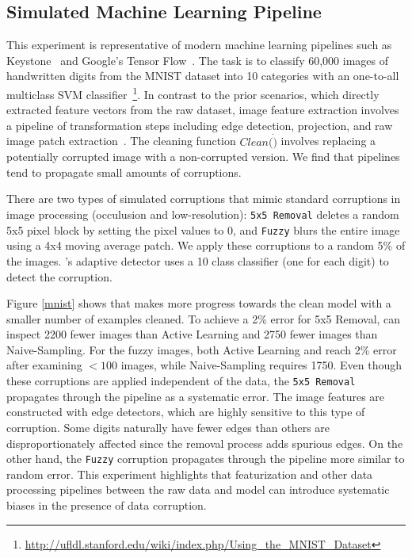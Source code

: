 \subsection{Simulated Machine Learning Pipeline}
This experiment is representative of modern machine learning pipelines such as Keystone~\cite{keystone} and Google's Tensor Flow~\cite{tensor}. 
The task is to classify 60,000 images of handwritten digits from the MNIST dataset into 10 categories with an one-to-all multiclass SVM classifier~\footnote{\scriptsize\url{http://ufldl.stanford.edu/wiki/index.php/Using_the_MNIST_Dataset}}. 
In contrast to the prior scenarios, which directly extracted feature vectors from the raw dataset, image feature extraction involves a pipeline of transformation steps including edge detection, projection, and raw image patch extraction~\cite{keystone,tensor}.
The cleaning function $Clean(\dot)$ involves replacing a potentially corrupted image with a non-corrupted version.
We find that pipelines tend to propagate small amounts of corruptions.

There are two types of simulated corruptions that mimic standard corruptions in image processing (occulusion and low-resolution): \texttt{5x5 Removal} deletes a random 5x5 pixel block by setting the pixel values to 0, and \texttt{Fuzzy} blurs the entire image using a 4x4 moving average patch. 
We apply these corruptions to a random 5\% of the images.
\sys's adaptive detector uses a 10 class classifier (one for each digit) to detect the corruption.

Figure \ref{mnist} shows that \sys makes more progress towards the clean model with a smaller number of examples cleaned.
To achieve a 2\% error for 5x5 Removal, \sys can inspect 2200 fewer images than Active Learning and 2750 fewer images than Naive-Sampling.
For the fuzzy images, both Active Learning and \sys reach 2\% error after examining $<100$ images, while Naive-Sampling requires 1750.
Even though these corruptions are applied independent of the data, the \texttt{5x5 Removal} propagates through the pipeline as a systematic error.
The image features are constructed with edge detectors, which are highly sensitive to this type of corruption.
Some digits naturally have fewer edges than others are disproportionately affected since the removal process adds spurious edges.
On the other hand, the \texttt{Fuzzy} corruption propagates through the pipeline more similar to random error.
This experiment highlights that featurization and other data processing pipelines between the raw data and model can introduce systematic biases in the presence of data corruption.

